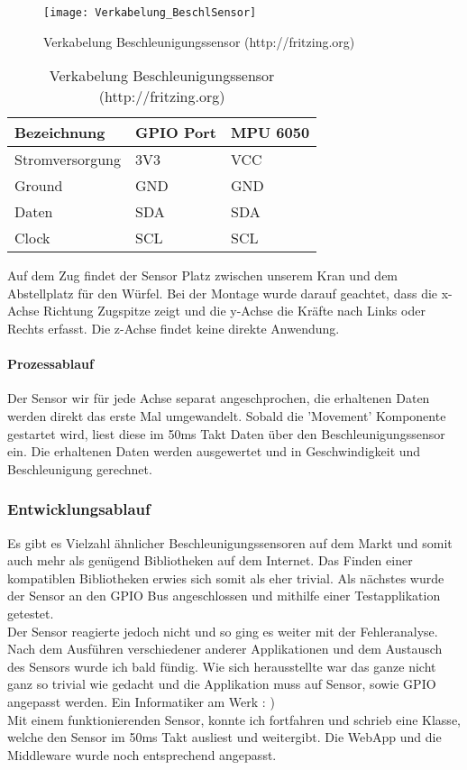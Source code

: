 \documentclass[../../main.tex]{subfiles}
\begin{document}
\begin{table}[H]
  \begin{figure}[H] \centering
    \texttt{[image: Verkabelung\_BeschlSensor]}
    \caption{Verkabelung Beschleunigungssensor (http://fritzing.org)}
    \label{fig:Beschleunigungssensor}
  \end{figure}
  \begin{center}
  \begin{tabular}{lll}
  Bezeichnung     & GPIO Port & MPU 6050 \\ \hline
  Stromversorgung & 3V3      & VCC      \\ \hline
  Ground          & GND      & GND      \\ \hline
  Daten          & SDA      & SDA       \\ \hline
  Clock          & SCL      & SCL       \\ \hline
  \end{tabular}
  \end{center}
\end{table}

Auf dem Zug findet der Sensor Platz zwischen unserem Kran und dem Abstellplatz für den Würfel. Bei der Montage wurde darauf geachtet, dass die x-Achse Richtung Zugspitze zeigt und die y-Achse die Kräfte nach Links oder Rechts erfasst. Die z-Achse findet keine direkte Anwendung.

\paragraph{Prozessablauf}
Der Sensor wir für jede Achse separat angeschprochen, die erhaltenen Daten werden direkt das erste Mal umgewandelt. Sobald die 'Movement' Komponente gestartet wird, liest diese im 50ms Takt Daten über den Beschleunigungssensor ein. Die erhaltenen Daten werden ausgewertet und in Geschwindigkeit und Beschleunigung gerechnet.

\subsubsection{Entwicklungsablauf}
Es gibt es Vielzahl ähnlicher Beschleunigungssensoren auf dem Markt und somit auch mehr als genügend Bibliotheken auf dem Internet. Das Finden einer kompatiblen Bibliotheken erwies sich somit als eher trivial. Als nächstes wurde der Sensor an den GPIO Bus angeschlossen und mithilfe einer Testapplikation getestet. \\
Der Sensor reagierte jedoch nicht und so ging es weiter mit der Fehleranalyse. Nach dem Ausführen verschiedener anderer Applikationen und dem Austausch des Sensors wurde ich bald fündig. Wie sich herausstellte war das ganze nicht ganz so trivial wie gedacht und die Applikation muss auf Sensor, sowie GPIO angepasst werden. Ein Informatiker am Werk : )\\
Mit einem funktionierenden Sensor, konnte ich fortfahren und schrieb eine Klasse, welche den Sensor im 50ms Takt ausliest und weitergibt. Die WebApp und die Middleware wurde noch entsprechend angepasst.\\
\end{document}

